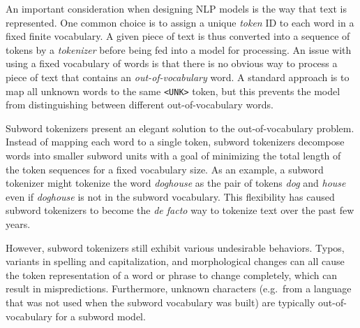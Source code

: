 \documentclass[11pt,a4paper]{article}
\begin{document}
An important consideration when designing NLP models is the way that text is represented.
One common choice is to assign a unique \textit{token} ID to each word in a fixed finite vocabulary.
A given piece of text is thus converted into a sequence of tokens by a \textit{tokenizer} before being fed into a model for processing.
An issue with using a fixed vocabulary of words is that there is no obvious way to process a piece of text that contains an \textit{out-of-vocabulary} word.
A standard approach is to map all unknown words to the same \texttt{<UNK>} token, but this prevents the model from distinguishing between different out-of-vocabulary words.

Subword tokenizers \cite{sennrich-etal-2016-neural, wu-2016-gnmt, kudo-richardson-2018-sentencepiece} present an elegant solution to the out-of-vocabulary problem.
Instead of mapping each word to a single token, subword tokenizers decompose words into smaller subword units with a goal of minimizing the total length of the token sequences for a fixed vocabulary size.
As an example, a subword tokenizer might tokenize the word \textit{doghouse} as the pair of tokens \textit{dog} and \textit{house} even if \textit{doghouse} is not in the subword vocabulary.
This flexibility has caused subword tokenizers to become the \textit{de facto} way to tokenize text over the past few years.

However, subword tokenizers still exhibit various undesirable behaviors.
Typos, variants in spelling and capitalization, and morphological changes can all cause the token representation of a word or phrase to change completely, which can result in mispredictions.
Furthermore, unknown characters (e.g.\ from a language that was not used when the subword vocabulary was built) are typically out-of-vocabulary for a subword model.
\end{document}
